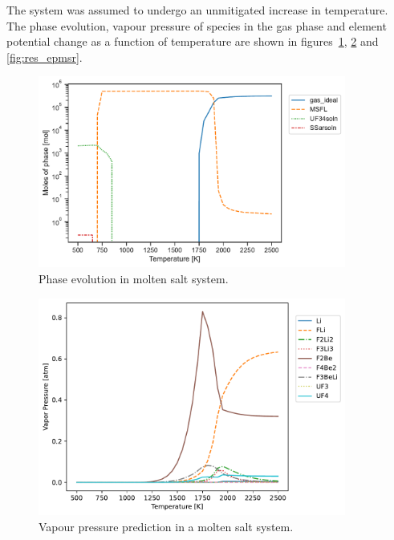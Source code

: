     The system was assumed to undergo an unmitigated increase in temperature. The phase evolution, vapour pressure of species in the gas phase and element potential change as a function of temperature are shown in figures~\ref{fig:res_molemsr}, \ref{fig:res_vpmsr} and \ref{fig:res_epmsr}.
        \begin{figure}[ht]
        \centering
        \includegraphics[width=0.9\textwidth]{figures/chapter-7/msr_moles.pdf}
        \caption{Phase evolution in molten salt system.}
        \label{fig:res_molemsr}
    \end{figure}
    \begin{figure}[ht]
        \centering
        \includegraphics[width=0.9\textwidth]{figures/chapter-7/msr_vp.pdf}
        \caption{Vapour pressure prediction in a molten salt system.}
        \label{fig:res_vpmsr}
    \end{figure}

